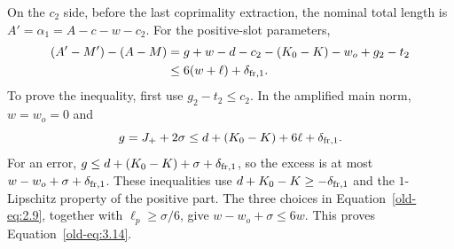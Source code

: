\documentclass[12pt]{article}
\begin{document}
On the \(c_2\) side, before the last coprimality extraction, the
nominal total length is \(A'=\alpha_1=A-c-w-c_2\).  For the positive-slot parameters,
\begin{equation}
 \begin{split}
 (A'-M')-(A-M)
 &=g+w-d-c_2-(K_0-K)-w_o+g_2-t_2\\
 &\le6(w+\ell)+\delta_{{\rm fr},1}.
 \end{split}
 \label{old-eq:3.14}
\end{equation}
To prove the inequality, first use \(g_2-t_2\le c_2\).
In the amplified main norm, \(w=w_o=0\) and
\[
 g=J_++2\sigma
 \le d+(K_0-K)+6\ell+\delta_{{\rm fr},1}.
\]
For an error,
\(g\le d+(K_0-K)+\sigma+\delta_{{\rm fr},1}\), so the excess is at most
\(w-w_o+\sigma+\delta_{{\rm fr},1}\).  These inequalities use
\(d+K_0-K\ge-\delta_{{\rm fr},1}\) and the
\(1\)-Lipschitz property of the positive part.  The three choices in
Equation~\eqref{old-eq:2.9}, together with
\(\ell_p\ge\sigma/6\), give
\(w-w_o+\sigma\le6w\).  This proves
Equation~\eqref{old-eq:3.14}.
\end{document}
